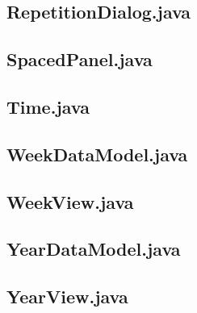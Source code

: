 \documentclass{article}
\begin{document}


\subsection{RepetitionDialog.java}



\subsection{SpacedPanel.java}



\subsection{Time.java}



\subsection{WeekDataModel.java}



\subsection{WeekView.java}



\subsection{YearDataModel.java}



\subsection{YearView.java}


\end{document}
